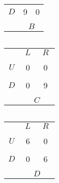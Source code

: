 \documentclass[12pt]{article}
\begin{document}
\begin{center}
\begin{tabular}{c|c|c|}
  $D$                  & 9                     & 0                      \\ [1ex] \cline{2-3}
\multicolumn{3}{c}{}                                                  \\ [-2ex]
\multicolumn{1}{c}{} & \multicolumn{2}{c}{$B$} \\
\end{tabular}
$\quad\quad$
\begin{tabular}{c|c|c|}
\multicolumn{1}{c}{} & \multicolumn{1}{c}{$\ L\ $} & \multicolumn{1}{c}{$\ R\ $}  \\ \cline{2-3}
 & \multicolumn{1}{|c|}{} & \multicolumn{1}{c|}{}                     \\ [-1.5ex]
  $U$                  & 0                     & 0                      \\ [1ex] \cline{2-3}
 & \multicolumn{1}{|c|}{} & \multicolumn{1}{c|}{}                     \\ [-1.5ex]
  $D$                  & 0                     & 9                      \\ [1ex] \cline{2-3}
\multicolumn{3}{c}{}                                                  \\ [-2ex]
\multicolumn{1}{c}{} & \multicolumn{2}{c}{$C$} \\
\end{tabular}
$\quad\quad$
\begin{tabular}{c|c|c|}
\multicolumn{1}{c}{} & \multicolumn{1}{c}{$\ L\ $} & \multicolumn{1}{c}{$\ R\ $}  \\ \cline{2-3}
 & \multicolumn{1}{|c|}{} & \multicolumn{1}{c|}{}                     \\ [-1.5ex]
  $U$                  & 6                     & 0                      \\ [1ex] \cline{2-3}
 & \multicolumn{1}{|c|}{} & \multicolumn{1}{c|}{}                     \\ [-1.5ex]
  $D$                  & 0                     & 6                      \\ [1ex] \cline{2-3}
\multicolumn{3}{c}{}                                                  \\ [-2ex]
\multicolumn{1}{c}{} & \multicolumn{2}{c}{$D$} \\
\end{tabular}
\end{center}
\end{document}
